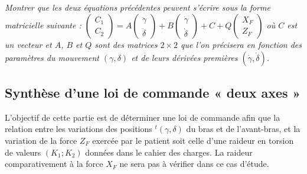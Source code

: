 \begin{multicols}{2}
\subparagraph{}\textit{Montrer que les deux équations précédentes peuvent s'écrire sous la forme matricielle suivante : 
$\begin{pmatrix}
C_1 \\ C_2
\end{pmatrix}
=
A
\begin{pmatrix}
\ddot{\gamma} \\ \ddot{\delta}
\end{pmatrix}
+
B
\begin{pmatrix}
\dot{\gamma} \\ \dot{\delta}
\end{pmatrix}
+
C
+
Q
\begin{pmatrix}
X_F \\ Z_F
\end{pmatrix}$ où $C$ est un vecteur et $A$, $B$ et $Q$ sont des matrices $2\times 2$ que l'on précisera en fonction des paramètres du mouvement $\left(\gamma,\delta\right)$ et de leurs dérivées premières $\left(\dot{\gamma},\dot{\delta}\right)$.
}

\ifprof
\begin{corrige}
\end{corrige}
\else
\fi


\ifprof
\begin{corrige}
\end{corrige}
\else
\fi


\ifprof
\begin{corrige}
\end{corrige}
\else
\fi



\subsection*{Synthèse d’une loi de commande « deux axes »}

\begin{obj}
L’objectif de cette partie est de déterminer une loi de commande afin que la relation entre les variations
des positions $ ^t\left(\gamma,\delta\right)$ du bras et de l’avant-bras, et la variation de la force $Z_F$ exercée par le patient soit celle d’une raideur en torsion de valeurs $(K_1;K_2)$ données dans le cahier des charges. La raideur comparativement à la force $X_F$ ne sera pas à vérifier dans ce cas d’étude.
\end{obj}



\end{multicols}
